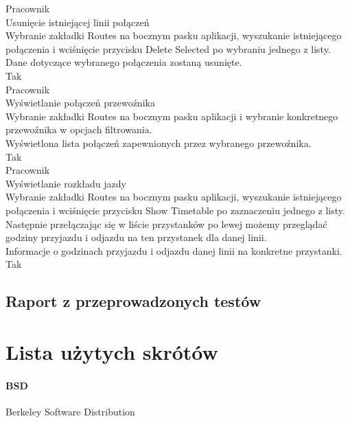 \documentclass[10pt,a4paper]{article}
\begin{document}
Pracownik\\
Usunięcie istniejącej linii połączeń\\
Wybranie zakładki Routes na bocznym pasku aplikacji, wyszukanie istniejącego połączenia i wciśnięcie przycisku Delete Selected po wybraniu jednego z listy.\\
Dane dotyczące wybranego połączenia zostaną usunięte.\\
Tak\\

Pracownik\\
Wyświetlanie połączeń przewoźnika\\
Wybranie zakładki Routes na bocznym pasku aplikacji i wybranie konkretnego przewoźnika w opcjach filtrowania.\\
Wyświetlona lista połączeń zapewnionych przez wybranego przewoźnika.\\
Tak\\

Pracownik\\
Wyświetlanie rozkładu jazdy\\
Wybranie zakładki Routes na bocznym pasku aplikacji, wyszukanie istniejącego połączenia i wciśnięcie przycisku Show Timetable po zaznaczeniu jednego z listy. Następnie przełączając się w liście przystanków po lewej możemy przeglądać godziny przyjazdu i odjazdu na ten przystanek dla danej linii.\\
Informacje o godzinach przyjazdu i odjazdu danej linii na konkretne przystanki.\\
Tak\\

\subsection{Raport z przeprowadzonych testów}

\section{Lista użytych skrótów}
\label{abbr:bsd}
\paragraph{BSD} Berkeley Software Distribution
\end{document}
